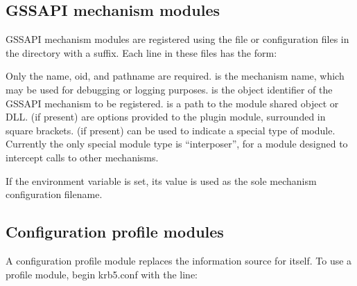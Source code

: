 \documentclass[letterpaper,10pt,english]{sphinxmanual}
\begin{document}
\subsection{GSSAPI mechanism modules}
\label{\detokenize{admin/host_config:gssapi-mechanism-modules}}\label{\detokenize{admin/host_config:gssapi-plugin-config}}
\sphinxAtStartPar
GSSAPI mechanism modules are registered using the file
{\hyperref[\detokenize{mitK5defaults:paths}]{}} or configuration files in the
{\hyperref[\detokenize{mitK5defaults:paths}]{}} directory with a 
suffix.  Each line in these files has the form:

\begin{sphinxVerbatim}[commandchars=\\\{\}]
      \PYG{p}{[}\PYG{p}{]}  
\end{sphinxVerbatim}

\sphinxAtStartPar
Only the name, oid, and pathname are required.   is the
mechanism name, which may be used for debugging or logging purposes.
 is the object identifier of the GSSAPI mechanism to be
registered.   is a path to the module shared object or DLL.
 (if present) are options provided to the plugin module,
surrounded in square brackets.   (if present) can be used to
indicate a special type of module.  Currently the only special module
type is “interposer”, for a module designed to intercept calls to
other mechanisms.

\sphinxAtStartPar
If the environment variable  is set, its value is
used as the sole mechanism configuration filename.


\subsection{Configuration profile modules}
\label{\detokenize{admin/host_config:configuration-profile-modules}}\label{\detokenize{admin/host_config:profile-plugin-config}}
\sphinxAtStartPar
A configuration profile module replaces the information source for
{\hyperref[\detokenize{admin/conf_files/krb5_conf:krb5-conf-5}]{}} itself.  To use a profile module, begin krb5.conf
with the line:
\end{document}
